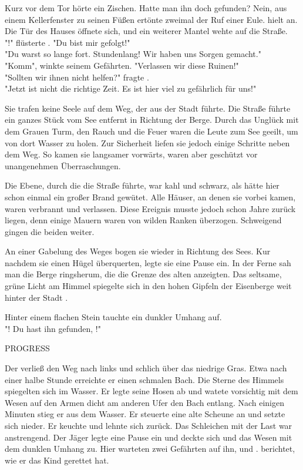 \begin{huge}
Kurz vor dem Tor hörte {\Eno} ein Zischen. Hatte man ihn doch gefunden? Nein, aus einem Kellerfenster zu seinen Füßen ertönte zweimal der Ruf einer Eule. {\Eno} hielt an. Die Tür des Hauses öffnete sich, und ein weiterer Mantel wehte auf die Straße.\\
"{\Bomar}!" flüsterte {\Eno}. "Du bist mir gefolgt!"\\
"Du warst so lange fort. Stundenlang! Wir haben uns Sorgen gemacht."\\
"Komm", {\Eno} winkte seinem Gefährten. "Verlassen wir diese Ruinen!"\\
"Sollten wir ihnen nicht helfen?" fragte {\Bomar}.\\
"Jetzt ist nicht die richtige Zeit. Es ist hier viel zu gefährlich für uns!"

Sie trafen keine Seele auf dem Weg, der aus der Stadt führte. Die Straße führte ein ganzes Stück vom See entfernt in Richtung der Berge. Durch das Unglück mit dem Grauen Turm, den Rauch und die Feuer waren die Leute zum See geeilt, um von dort Wasser zu holen. Zur Sicherheit liefen sie jedoch einige Schritte neben dem Weg. So kamen sie langsamer vorwärts, waren aber geschützt vor unangenehmen Überraschungen.

Die Ebene, durch die die Straße führte, war kahl und schwarz, als hätte hier schon einmal ein großer Brand gewütet. Alle Häuser, an denen sie vorbei kamen, waren verbrannt und verlassen. Diese Ereignis musste jedoch schon Jahre zurück liegen, denn einige Mauern waren von wilden Ranken überzogen. Schweigend gingen die beiden {\Schattenlaufer} weiter.

An einer Gabelung des Weges bogen sie wieder in Richtung des Sees. Kur nachdem sie einen Hügel überquerten, legte sie eine Pause ein. In der Ferne sah man die Berge ringsherum, die die Grenze des alten  anzeigten. Das seltsame, grüne Licht am Himmel spiegelte sich in den hohen Gipfeln der Eisenberge weit hinter der Stadt {\Tern}.

Hinter einem flachen Stein tauchte ein dunkler Umhang auf.\\
"{\Eno}! Du hast ihn gefunden, {\Bomar}!"

PROGRESS

Der \Schattenjager verließ den Weg nach links und schlich über das niedrige Gras. Etwa nach einer halbe Stunde erreichte er einen schmalen Bach. Die Sterne des Himmels spiegelten sich im Wasser. Er legte seine Hosen ab und watete vorsichtig mit dem Wesen auf den Armen dicht am anderen Ufer den Bach entlang. Nach einigen Minuten stieg er aus dem Wasser. Er steuerte eine alte Scheune an und setzte sich nieder. Er keuchte und lehnte sich zurück. Das Schleichen mit der Last war anstrengend. Der Jäger legte eine Pause ein und deckte sich und das Wesen mit dem dunklen Umhang zu. Hier warteten zwei Gefährten auf ihn, \Bomar und \Dolo.
\Eno berichtet, wie er das Kind gerettet hat.


\end{huge}

